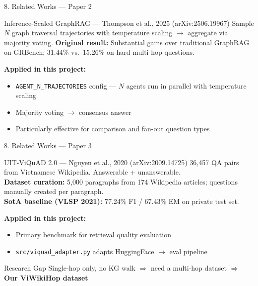 \documentclass[aspectratio=169]{beamer}
\begin{document}
\begin{frame}{8. Related Works --- Paper 2}
\begin{block}{Inference-Scaled GraphRAG --- Thompson et al., 2025 (arXiv:2506.19967)}
Sample $N$ graph traversal trajectories with temperature scaling $\rightarrow$ aggregate via majority voting.
\textbf{Original result:} Substantial gains over traditional GraphRAG on GRBench; 31.44\% vs.\ 15.26\% on hard multi-hop questions.
\end{block}
\vspace{0.6em}
\textbf{Applied in this project:}
\begin{itemize}
  \item \texttt{AGENT\_N\_TRAJECTORIES} config --- $N$ agents run in parallel with temperature scaling
  \item Majority voting $\rightarrow$ consensus answer
  \item Particularly effective for comparison and fan-out question types
\end{itemize}
\end{frame}

\begin{frame}[shrink=5]{8. Related Works --- Paper 3}
\begin{block}{UIT-ViQuAD 2.0 --- Nguyen et al., 2020 (arXiv:2009.14725)}
36,457 QA pairs from Vietnamese Wikipedia. Answerable + unanswerable.\\[4pt]
\textbf{Dataset curation:} 5,000 paragraphs from 174 Wikipedia articles; questions manually created per paragraph.\\[4pt]
\textbf{SotA baseline (VLSP 2021):} 77.24\% F1 / 67.43\% EM on private test set.
\end{block}
\vspace{0.4em}
\textbf{Applied in this project:}
\begin{itemize}
  \item Primary benchmark for retrieval quality evaluation
  \item \texttt{src/viquad\_adapter.py} adapts HuggingFace $\rightarrow$ eval pipeline
\end{itemize}
\vspace{0.3em}
\begin{alertblock}{Research Gap}
Single-hop only, no KG walk $\Rightarrow$ need a multi-hop dataset $\Rightarrow$ \textbf{Our ViWikiHop dataset}
\end{alertblock}
\end{frame}
\end{document}
